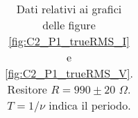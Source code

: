 \begin{table}[H]
\begin{center}
\begin{tabular}{|c|c|c|c|c|c|c|c|c|}
\end{tabular}
\end{center}
\caption{
Dati relativi ai grafici delle figure \ref{fig:C2_P1_trueRMS_I} e \ref{fig:C2_P1_trueRMS_V}.
Resitore $R=990\pm20$ $\Omega$.
$T=1/\nu$ indica il periodo.
}
\label{tab:C2_P1_trueRMS}
\end{table}
